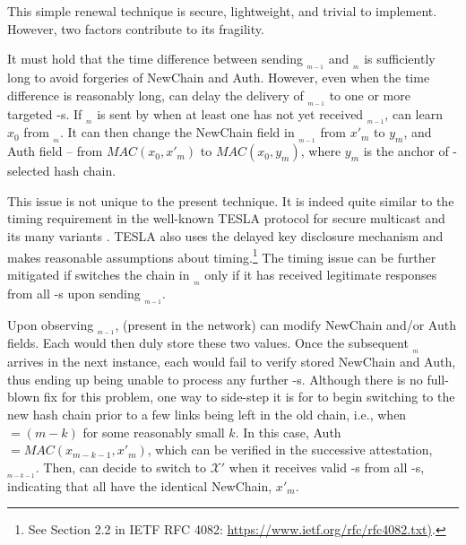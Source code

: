 This simple renewal technique is secure, lightweight, and trivial to implement. 
However, two factors contribute to its fragility. 

It must hold that the time difference between \vrf sending \Attreq$_{_{m-1}}$
and \Attreq$_{_{m}}$ is sufficiently long to avoid forgeries of NewChain and Auth. However, even 
when the time difference is reasonably long, \sadv can delay the delivery of \Attreq$_{_{m-1}}$ 
to one or more targeted \prv-s. If \Attreq$_{_{m}}$ is sent by \vrf
when at least one \prv has not yet received \Attreq$_{_{m-1}}$, \sadv can learn $x_0$ from \Attreq$_{_{m}}$. 
It can then change the NewChain field in \Attreq$_{_{m-1}}$  from $x'_m$ to $y_m$, and Auth field --
from $MAC(x_0,x'_m)$ to $MAC(x_0,y_m)$, where $y_m$ is the anchor of \sadv-selected hash chain.

This issue is not unique to the present technique. It is indeed quite similar to the timing requirement
in the well-known TESLA protocol for secure multicast and its many variants \cite{perrig-tesla}.
TESLA also uses the delayed key disclosure mechanism and makes reasonable assumptions about 
timing.\footnote{See Section 2.2 in IETF RFC 4082: \url{https://www.ietf.org/rfc/rfc4082.txt)}.}
The timing issue can be further mitigated if \vrf switches the chain in 
\Attreq$_{_{m}}$ only if it has received legitimate responses from all \prv-s upon
sending \Attreq$_{_{m-1}}$. 

Upon observing \Attreq$_{_{m-1}}$, \sadv (present in the network) can modify 
NewChain and/or Auth fields. Each \prv would then duly store these two values. Once the subsequent 
\Attreq$_{_m}$ arrives in the next \sa instance, each \prv would fail to verify stored NewChain and Auth, 
thus ending up being unable to process any further \Attreq-s. Although there is no full-blown fix for 
this problem, one way to side-step it is for \vrf to begin switching to the new hash chain prior 
to a few links being left in the old chain, i.e., when \curhash \ $=(m-k)$ for some reasonably small $k$.
In this case, Auth $={MAC(x_{m-k-1},x'_m)}$, which can be verified in the successive attestation, 
\Attreq$_{_{m-k-1}}$. Then, \vrf can decide to switch to ${\mathcal X'}$ when it receives valid 
\Attrep-s from all \prv-s, indicating that all have the identical NewChain, ${x'_m}$.


